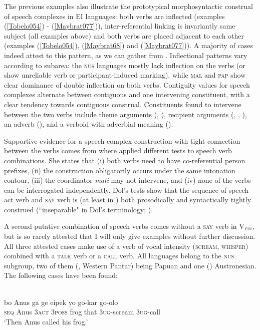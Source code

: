 The previous examples also illustrate the prototypical morphosyntactic construal of speech complexes in EI languages: both verbs are inflected (examples (\ref{Tobelo054}) - (\ref{Maybrat077})), inter-referential linking is invariantly same subject (all examples above) and both verbs are placed adjacent to each other (examples (\ref{Tobelo054}), (\ref{Maybrat68}) and (\ref{Maybrat077})). A majority of cases indeed attest to this pattern, as we can gather from . Inflectional patterns vary according to subarea: the \textsc{nus} languages mostly lack inflection on the verbs (or show unreliable verb or participant-induced marking), while \textsc{mal} and \textsc{pap} show clear dominance of double inflection on both verbs. Contiguity values for speech complexes alternate between contiguous and one intervening constituent, with a clear tendency towards contiguous construal. Constituents found to intervene between the two verbs include theme arguments (, ), recipient arguments (, , ), an adverb (), and a verboid with adverbial meaning ().

Supportive evidence for a speech complex construction with tight connection between the verbs comes from  where \citet[202]{dol2007grammar} applied different tests to speech verb combinations. She states that (i) both verbs need to have co-referential person prefixes, (ii) the construction obligatorily occurs under the same intonation contour, (iii) the coordinator \textit{mati} may not intervene, and (iv) none of the verbs can be interrogated independently. Dol's tests show that the sequence of speech act verb and \textsc{say} verb is (at least in ) both prosodically and syntactically tightly construed (``inseparable" in Dol's terminology; \citealt[202]{dol2007grammar}).

A second putative combination of speech verbs comes without a \textsc{say} verb in V$_{\textsc{fin}}$, but is so rarely attested that I will only give examples without further discussion. All three attested cases make use of a verb of vocal intensity (\textsc{scream}, \textsc{whisper}) combined with a \textsc{talk} verb or a \textsc{call} verb. All languages belong to the \textsc{nus} subgroup, two of them (, Western Pantar) being Papuan and one () Austronesian. The following cases have been found:

\ea \label{Klon077}
\\
\gll bo Anus ga ge eipek yo go-kar go-olo \\
\textsc{seq} Anus \textsc{3}\textsc{act} \textsc{3}\textsc{poss} frog that \textsc{3}\textsc{ug}-scream \textsc{3}\textsc{ug}-call \\
\glft `Then Anus called his frog.' \\ 
\z

